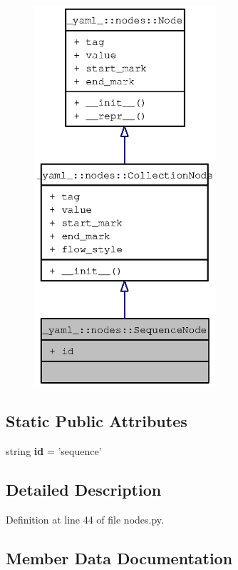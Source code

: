 \begin{figure}[H]
\begin{center}
\leavevmode
\includegraphics[height=400pt]{class__yaml___1_1nodes_1_1SequenceNode__coll__graph}
\end{center}
\end{figure}
\subsection*{Static Public Attributes}
\begin{CompactItemize}
\item 
string {\bf id} = 'sequence'
\end{CompactItemize}


\subsection{Detailed Description}


Definition at line 44 of file nodes.py.

\subsection{Member Data Documentation}
